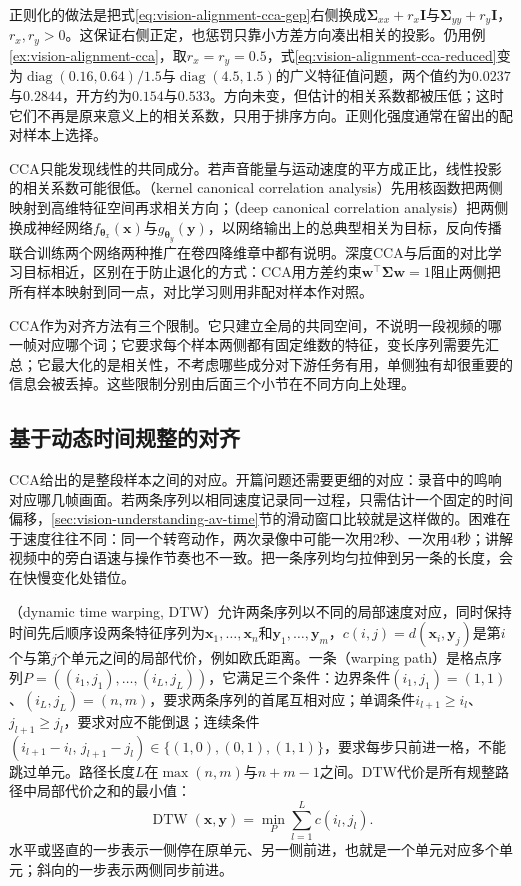 正则化的做法是把式\eqref{eq:vision-alignment-cca-gep}右侧换成$\bm\Sigma_{xx}+r_x\bm I$与$\bm\Sigma_{yy}+r_y\bm I$，$r_x,r_y>0$。这保证右侧正定，也惩罚只靠小方差方向凑出相关的投影。仍用例\ref{ex:vision-alignment-cca}，取$r_x=r_y=0.5$，式\eqref{eq:vision-alignment-cca-reduced}变为$\operatorname{diag}(0.16,0.64)/1.5$与$\operatorname{diag}(4.5,1.5)$的广义特征值问题，两个值约为$0.0237$与$0.2844$，开方约为$0.154$与$0.533$。方向未变，但估计的相关系数都被压低；这时它们不再是原来意义上的相关系数，只用于排序方向。正则化强度通常在留出的配对样本上选择。

CCA只能发现线性的共同成分。若声音能量与运动速度的平方成正比，线性投影的相关系数可能很低。（kernel canonical correlation analysis）先用核函数把两侧映射到高维特征空间再求相关方向；（deep canonical correlation analysis）把两侧换成神经网络$f_{\bm\theta_x}(\bm x)$与$g_{\bm\theta_y}(\bm y)$，以网络输出上的总典型相关为目标，反向传播联合训练两个网络两种推广在卷四降维章中都有说明。深度CCA与后面的对比学习目标相近，区别在于防止退化的方式：CCA用方差约束$\bm w^\top\bm\Sigma\bm w=1$阻止两侧把所有样本映射到同一点，对比学习则用非配对样本作对照。

CCA作为对齐方法有三个限制。它只建立全局的共同空间，不说明一段视频的哪一帧对应哪个词；它要求每个样本两侧都有固定维数的特征，变长序列需要先汇总；它最大化的是相关性，不考虑哪些成分对下游任务有用，单侧独有却很重要的信息会被丢掉。这些限制分别由后面三个小节在不同方向上处理。

\subsection{基于动态时间规整的对齐}
\label{sec:vision-alignment-dtw}

CCA给出的是整段样本之间的对应。开篇问题还需要更细的对应：录音中的鸣响对应哪几帧画面。若两条序列以相同速度记录同一过程，只需估计一个固定的时间偏移，\ref{sec:vision-understanding-av-time}节的滑动窗口比较就是这样做的。困难在于速度往往不同：同一个转弯动作，两次录像中可能一次用2秒、一次用4秒；讲解视频中的旁白语速与操作节奏也不一致。把一条序列均匀拉伸到另一条的长度，会在快慢变化处错位。

（dynamic time warping, DTW）允许两条序列以不同的局部速度对应，同时保持时间先后顺序设两条特征序列为$\bm x_1,\ldots,\bm x_n$和$\bm y_1,\ldots,\bm y_m$，$c(i,j)=d(\bm x_i,\bm y_j)$是第$i$个与第$j$个单元之间的局部代价，例如欧氏距离。一条（warping path）是格点序列$P=((i_1,j_1),\ldots,(i_L,j_L))$，它满足三个条件：边界条件$(i_1,j_1)=(1,1)$、$(i_L,j_L)=(n,m)$，要求两条序列的首尾互相对应；单调条件$i_{l+1}\geq i_l$、$j_{l+1}\geq j_l$，要求对应不能倒退；连续条件$(i_{l+1}-i_l,\,j_{l+1}-j_l)\in\{(1,0),(0,1),(1,1)\}$，要求每步只前进一格，不能跳过单元。路径长度$L$在$\max(n,m)$与$n+m-1$之间。DTW代价是所有规整路径中局部代价之和的最小值：
\begin{equation}
  \operatorname{DTW}(\bm x,\bm y)=\min_{P}\sum_{l=1}^{L}c(i_l,j_l).
  \label{eq:vision-alignment-dtw}
\end{equation}
水平或竖直的一步表示一侧停在原单元、另一侧前进，也就是一个单元对应多个单元；斜向的一步表示两侧同步前进。


